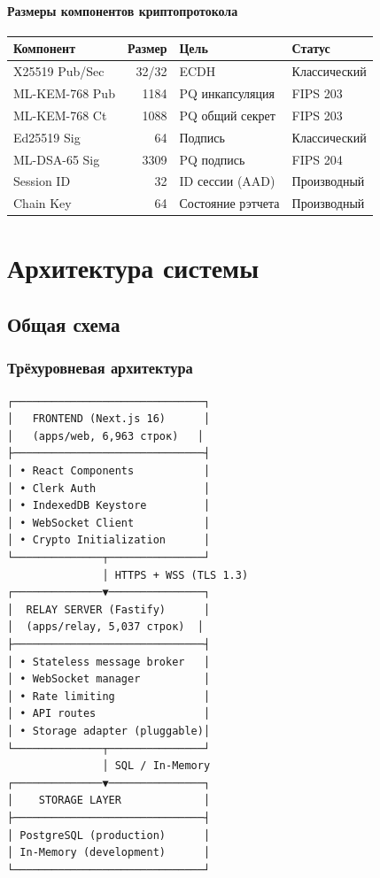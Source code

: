 \documentclass[11pt,a4paper,oneside]{book}
\begin{document}
\vspace{-0.2cm}\subsection{Размеры компонентов криптопротокола}
\begin{table}[h]
\centering
\begin{tabular}{|l|r|l|l|}
\hline
\textbf{Компонент} & \textbf{Размер} & \textbf{Цель} & \textbf{Статус} \\
\hline
X25519 Pub/Sec & 32/32 & ECDH & Классический \\
\hline
ML-KEM-768 Pub & 1184 & PQ инкапсуляция & FIPS 203 \\
\hline
ML-KEM-768 Ct & 1088 & PQ общий секрет & FIPS 203 \\
\hline
Ed25519 Sig & 64 & Подпись & Классический \\
\hline
ML-DSA-65 Sig & 3309 & PQ подпись & FIPS 204 \\
\hline
Session ID & 32 & ID сессии (AAD) & Производный \\
\hline
Chain Key & 64 & Состояние рэтчета & Производный \\
\hline
\end{tabular}
\end{table}
\vspace{-1cm}\part{Архитектура системы}
\vspace{-0.5cm}\chapter{Общая схема}
\vspace{-0.3cm}\section{Трёхуровневая архитектура}
\begin{verbatim}
┌──────────────────────────────┐
│   FRONTEND (Next.js 16)      │
│   (apps/web, 6,963 строк)   │
├──────────────────────────────┤
│ • React Components           │
│ • Clerk Auth                 │
│ • IndexedDB Keystore         │
│ • WebSocket Client           │
│ • Crypto Initialization      │
└──────────────┬───────────────┘
               │ HTTPS + WSS (TLS 1.3)
┌──────────────▼───────────────┐
│  RELAY SERVER (Fastify)      │
│  (apps/relay, 5,037 строк)  │
├──────────────────────────────┤
│ • Stateless message broker   │
│ • WebSocket manager          │
│ • Rate limiting              │
│ • API routes                 │
│ • Storage adapter (pluggable)│
└──────────────┬───────────────┘
               │ SQL / In-Memory
┌──────────────▼───────────────┐
│    STORAGE LAYER             │
├──────────────────────────────┤
│ PostgreSQL (production)      │
│ In-Memory (development)      │
└──────────────────────────────┘
\end{verbatim}
\end{document}
